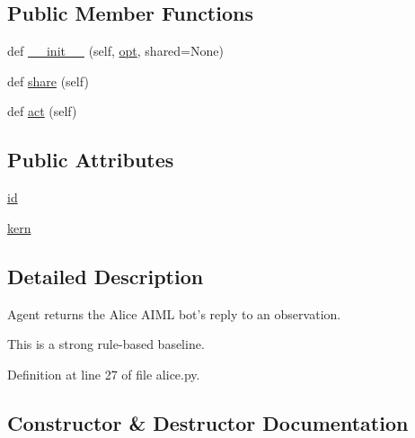 \subsection*{Public Member Functions}
\begin{DoxyCompactItemize}
\item 
def \hyperlink{classparlai_1_1agents_1_1alice_1_1alice_1_1AliceAgent_a41e6181062031ec64f9a79c28814f137}{\+\_\+\+\_\+init\+\_\+\+\_\+} (self, \hyperlink{classparlai_1_1core_1_1agents_1_1Agent_ab3b45d2754244608c75d4068b90cd051}{opt}, shared=None)
\item 
def \hyperlink{classparlai_1_1agents_1_1alice_1_1alice_1_1AliceAgent_a1ed8fa0a0fba59ae248ceee848eb88d9}{share} (self)
\item 
def \hyperlink{classparlai_1_1agents_1_1alice_1_1alice_1_1AliceAgent_ab7156067d553d3f250513090c331eb4a}{act} (self)
\end{DoxyCompactItemize}
\subsection*{Public Attributes}
\begin{DoxyCompactItemize}
\item 
\hyperlink{classparlai_1_1agents_1_1alice_1_1alice_1_1AliceAgent_a14ed30ca08dfb78e858174421e42d980}{id}
\item 
\hyperlink{classparlai_1_1agents_1_1alice_1_1alice_1_1AliceAgent_aba3ce3bff554b5b7ab236a7574a83348}{kern}
\end{DoxyCompactItemize}


\subsection{Detailed Description}
\begin{DoxyVerb}Agent returns the Alice AIML bot's reply to an observation.

This is a strong rule-based baseline.
\end{DoxyVerb}
 

Definition at line 27 of file alice.\+py.



\subsection{Constructor \& Destructor Documentation}
\mbox{\label{classparlai_1_1agents_1_1alice_1_1alice_1_1AliceAgent_a41e6181062031ec64f9a79c28814f137}} 
